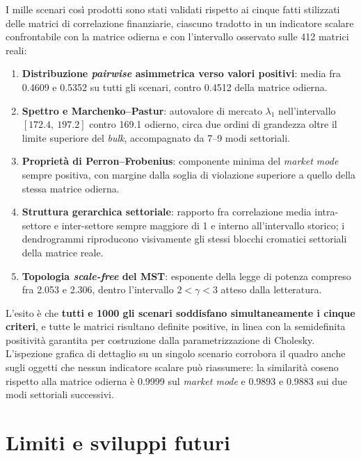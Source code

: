 \documentclass[11pt,a4paper]{article}
\begin{document}
I mille scenari così prodotti sono stati validati rispetto ai cinque fatti
stilizzati delle matrici di correlazione finanziarie, ciascuno tradotto in un
indicatore scalare confrontabile con la matrice odierna e con l'intervallo
osservato sulle 412 matrici reali:

\begin{enumerate}[leftmargin=1.4em,itemsep=0.2em,topsep=0.35em]
  \item \textbf{Distribuzione \emph{pairwise} asimmetrica verso valori
        positivi}: media fra 0.4609 e 0.5352 su tutti gli scenari, contro
        0.4512 della matrice odierna.
  \item \textbf{Spettro e Marchenko--Pastur}: autovalore di mercato
        $\lambda_1$ nell'intervallo $[172.4,\ 197.2]$ contro 169.1 odierno,
        circa due ordini di grandezza oltre il limite superiore del
        \emph{bulk}, accompagnato da 7--9 modi settoriali.
  \item \textbf{Proprietà di Perron--Frobenius}: componente minima del
        \emph{market mode} sempre positiva, con margine dalla soglia di
        violazione superiore a quello della stessa matrice odierna.
  \item \textbf{Struttura gerarchica settoriale}: rapporto fra correlazione
        media intra-settore e inter-settore sempre maggiore di 1 e interno
        all'intervallo storico; i dendrogrammi riproducono visivamente gli
        stessi blocchi cromatici settoriali della matrice reale.
  \item \textbf{Topologia \emph{scale-free} del MST}: esponente della legge di
        potenza compreso fra 2.053 e 2.306, dentro l'intervallo
        $2 < \gamma < 3$ atteso dalla letteratura.
\end{enumerate}

L'esito è che \textbf{tutti e 1000 gli scenari soddisfano simultaneamente i
cinque criteri}, e tutte le matrici risultano definite positive, in linea con la
semidefinita positività garantita per costruzione dalla parametrizzazione
di Cholesky. L'ispezione grafica di
dettaglio su un singolo scenario corrobora il quadro anche sugli oggetti che
nessun indicatore scalare può riassumere: la similarità coseno rispetto alla
matrice odierna è 0.9999 sul \emph{market mode} e 0.9893 e 0.9883 sui due modi
settoriali successivi.

\section{Limiti e sviluppi futuri}
\end{document}
